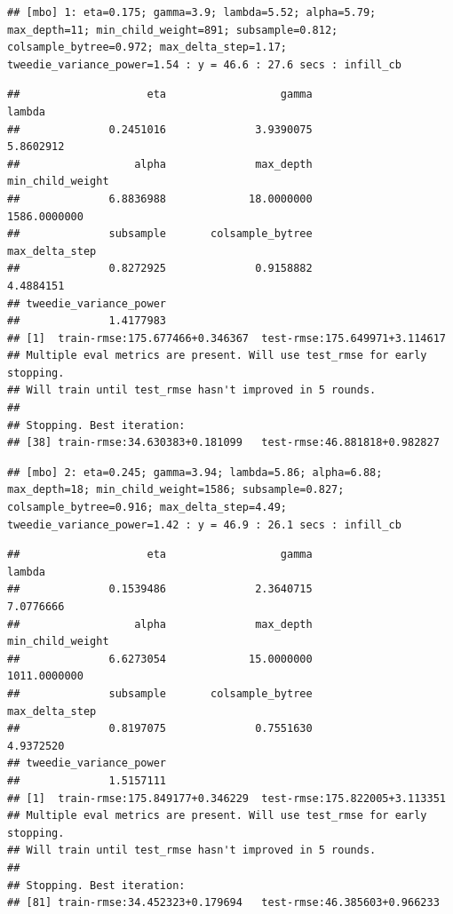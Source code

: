 \documentclass[
]{article}
\begin{document}
\begin{verbatim}
## [mbo] 1: eta=0.175; gamma=3.9; lambda=5.52; alpha=5.79; max_depth=11; min_child_weight=891; subsample=0.812; colsample_bytree=0.972; max_delta_step=1.17; tweedie_variance_power=1.54 : y = 46.6 : 27.6 secs : infill_cb
\end{verbatim}

\begin{verbatim}
##                    eta                  gamma                 lambda 
##              0.2451016              3.9390075              5.8602912 
##                  alpha              max_depth       min_child_weight 
##              6.8836988             18.0000000           1586.0000000 
##              subsample       colsample_bytree         max_delta_step 
##              0.8272925              0.9158882              4.4884151 
## tweedie_variance_power 
##              1.4177983 
## [1]  train-rmse:175.677466+0.346367  test-rmse:175.649971+3.114617 
## Multiple eval metrics are present. Will use test_rmse for early stopping.
## Will train until test_rmse hasn't improved in 5 rounds.
## 
## Stopping. Best iteration:
## [38] train-rmse:34.630383+0.181099   test-rmse:46.881818+0.982827
\end{verbatim}

\begin{verbatim}
## [mbo] 2: eta=0.245; gamma=3.94; lambda=5.86; alpha=6.88; max_depth=18; min_child_weight=1586; subsample=0.827; colsample_bytree=0.916; max_delta_step=4.49; tweedie_variance_power=1.42 : y = 46.9 : 26.1 secs : infill_cb
\end{verbatim}

\begin{verbatim}
##                    eta                  gamma                 lambda 
##              0.1539486              2.3640715              7.0776666 
##                  alpha              max_depth       min_child_weight 
##              6.6273054             15.0000000           1011.0000000 
##              subsample       colsample_bytree         max_delta_step 
##              0.8197075              0.7551630              4.9372520 
## tweedie_variance_power 
##              1.5157111 
## [1]  train-rmse:175.849177+0.346229  test-rmse:175.822005+3.113351 
## Multiple eval metrics are present. Will use test_rmse for early stopping.
## Will train until test_rmse hasn't improved in 5 rounds.
## 
## Stopping. Best iteration:
## [81] train-rmse:34.452323+0.179694   test-rmse:46.385603+0.966233
\end{verbatim}
\end{document}
